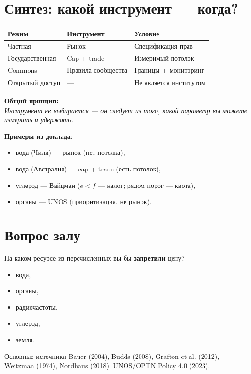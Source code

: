 \documentclass[12pt]{article}
\begin{document}
\section{Синтез: какой инструмент — когда?}

\begin{tabular}{@{}lll@{}}
\toprule
\textbf{Режим} & \textbf{Инструмент} & \textbf{Условие} \\
\midrule
Частная & Рынок & Спецификация прав \\
Государственная & Cap + trade & Измеримый потолок \\
Commons & Правила сообщества & Границы + мониторинг \\
Открытый доступ & — & Не является институтом \\
\bottomrule
\end{tabular}
\vspace{0.5cm}

\textbf{Общий принцип:} \\
\textit{Инструмент не выбирается — он следует из того, какой параметр вы можете измерить и удержать.}

\textbf{Примеры из доклада:}
\begin{itemize}
\item вода (Чили) — рынок (нет потолка),
\item вода (Австралия) — cap + trade (есть потолок),
\item углерод — Вайцман ($e < f$ — налог; рядом порог — квота),
\item органы — UNOS (приоритизация, не рынок).
\end{itemize}

\section{Вопрос залу}

На каком ресурсе из перечисленных вы бы \textbf{запретили} цену?
\begin{itemize}
\item вода,
\item органы,
\item радиочастоты,
\item углерод,
\item земля.
\end{itemize}

\vspace{1cm}
\begin{tcolorbox}{Основные источники}
Bauer (2004), Budds (2008), Grafton et al. (2012), Weitzman (1974), Nordhaus (2018), UNOS/OPTN Policy 4.0 (2023).
\end{tcolorbox}
\end{document}
